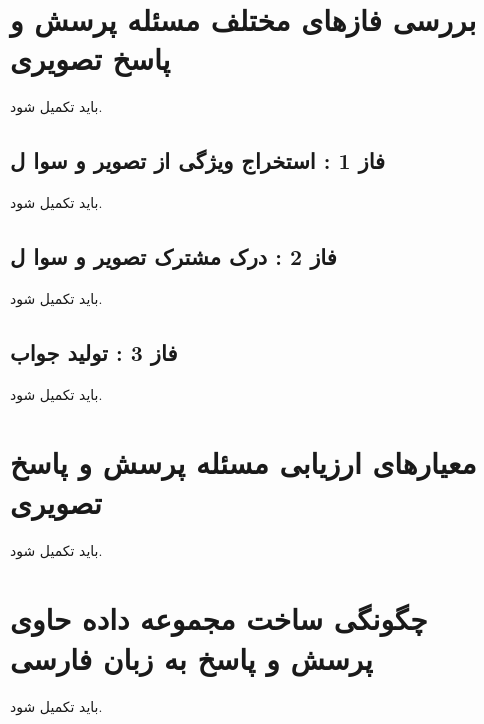 \section{بررسی فازهای مختلف مسئله پرسش و پاسخ تصویری}
باید تکمیل شود.
\subsection{فاز 1 : استخراج ویژگی از تصویر و سوا ل}
باید تکمیل شود.
\subsection{فاز 2 : درک مشترک تصویر و سوا ل}
باید تکمیل شود.
\subsection{فاز 3 : تولید جواب}
باید تکمیل شود.
\section{معیارهای ارزیابی مسئله پرسش و پاسخ تصویری}
باید تکمیل شود.
\section{ چگونگی ساخت مجموعه داده حاوی پرسش و پاسخ به زبان فارسی}
باید تکمیل شود.